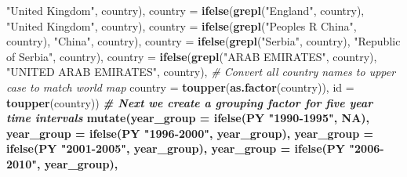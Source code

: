 \documentclass[
]{article}
\newenvironment{Shaded}{\begin{snugshade}}{\end{snugshade}}
\newcommand{\CommentTok}[1]{\textcolor[rgb]{0.56,0.35,0.01}{\textit{#1}}}
\newcommand{\DataTypeTok}[1]{\textcolor[rgb]{0.13,0.29,0.53}{#1}}
\newcommand{\DecValTok}[1]{\textcolor[rgb]{0.00,0.00,0.81}{#1}}
\newcommand{\KeywordTok}[1]{\textcolor[rgb]{0.13,0.29,0.53}{\textbf{#1}}}
\newcommand{\NormalTok}[1]{#1}
\newcommand{\OperatorTok}[1]{\textcolor[rgb]{0.81,0.36,0.00}{\textbf{#1}}}
\newcommand{\OtherTok}[1]{\textcolor[rgb]{0.56,0.35,0.01}{#1}}
\newcommand{\StringTok}[1]{\textcolor[rgb]{0.31,0.60,0.02}{#1}}
\begin{document}
\begin{Shaded}
\begin{Highlighting}[]
{{                          \StringTok{"United Kingdom"}\NormalTok{, country),}
         \DataTypeTok{country =} \KeywordTok{ifelse}\NormalTok{(}\KeywordTok{grepl}\NormalTok{(}\StringTok{"England"}\NormalTok{, country), }
                          \StringTok{"United Kingdom"}\NormalTok{, country),}
         \DataTypeTok{country =} \KeywordTok{ifelse}\NormalTok{(}\KeywordTok{grepl}\NormalTok{(}\StringTok{"Peoples R China"}\NormalTok{, country), }
                          \StringTok{"China"}\NormalTok{, country),}
         \DataTypeTok{country =} \KeywordTok{ifelse}\NormalTok{(}\KeywordTok{grepl}\NormalTok{(}\StringTok{"Serbia"}\NormalTok{, country), }
                          \StringTok{"Republic of Serbia"}\NormalTok{, country),}
         \DataTypeTok{country =} \KeywordTok{ifelse}\NormalTok{(}\KeywordTok{grepl}\NormalTok{(}\StringTok{"ARAB EMIRATES"}\NormalTok{, country), }
                          \StringTok{"UNITED ARAB EMIRATES"}\NormalTok{, country),}
         \CommentTok{# Convert all country names to upper case to match world map}
         \DataTypeTok{country =} \KeywordTok{toupper}\NormalTok{(}\KeywordTok{as.factor}\NormalTok{(country)),}
         \DataTypeTok{id =} \KeywordTok{toupper}\NormalTok{(country)) }\OperatorTok{%>%}
\StringTok{  }\CommentTok{# Next we create a grouping factor for five year time intervals}
\StringTok{  }\KeywordTok{mutate}\NormalTok{(}\DataTypeTok{year_group =} \KeywordTok{ifelse}\NormalTok{(PY }\OperatorTok{%in%}\StringTok{ }\KeywordTok{as.character}\NormalTok{(}\KeywordTok{c}\NormalTok{(}\DecValTok{1990}\OperatorTok{:}\DecValTok{1995}\NormalTok{)), }
                             \StringTok{"1990-1995"}\NormalTok{, }\OtherTok{NA}\NormalTok{),}
         \DataTypeTok{year_group =} \KeywordTok{ifelse}\NormalTok{(PY }\OperatorTok{%in%}\StringTok{ }\KeywordTok{as.character}\NormalTok{(}\KeywordTok{c}\NormalTok{(}\DecValTok{1996}\OperatorTok{:}\DecValTok{2000}\NormalTok{)), }
                             \StringTok{"1996-2000"}\NormalTok{, year_group),}
         \DataTypeTok{year_group =} \KeywordTok{ifelse}\NormalTok{(PY }\OperatorTok{%in%}\StringTok{ }\KeywordTok{as.character}\NormalTok{(}\KeywordTok{c}\NormalTok{(}\DecValTok{2001}\OperatorTok{:}\DecValTok{2005}\NormalTok{)), }
                             \StringTok{"2001-2005"}\NormalTok{, year_group),}
         \DataTypeTok{year_group =} \KeywordTok{ifelse}\NormalTok{(PY }\OperatorTok{%in%}\StringTok{ }\KeywordTok{as.character}\NormalTok{(}\KeywordTok{c}\NormalTok{(}\DecValTok{2006}\OperatorTok{:}\DecValTok{2010}\NormalTok{)), }
                             \StringTok{"2006-2010"}\NormalTok{, year_group),}
}}}}}}}
\end{Highlighting}
\end{Shaded}
\end{document}
